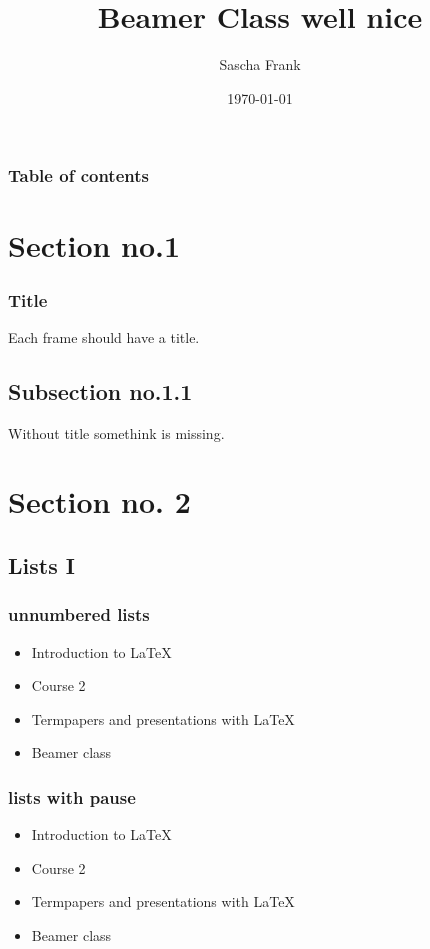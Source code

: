 \documentclass{beamer}
\begin{document}
\title{Beamer Class well nice}  
\author{Sascha Frank}
\date{\today} 

\begin{frame}
\titlepage
\end{frame}

\begin{frame}\frametitle{Table of contents}\tableofcontents
\end{frame} 


\section{Section no.1} 
\begin{frame}\frametitle{Title} 
Each frame should have a title.
\end{frame}
\subsection{Subsection no.1.1  }
\begin{frame} 
Without title somethink is missing. 
\end{frame}


\section{Section no. 2} 
\subsection{Lists I}
\begin{frame}\frametitle{unnumbered lists}
\begin{itemize}
\item Introduction to  \LaTeX  
\item Course 2 
\item Termpapers and presentations with \LaTeX 
\item Beamer class
\end{itemize} 
\end{frame}

\begin{frame}\frametitle{lists with pause}
\begin{itemize}
\item Introduction to  \LaTeX \pause 
\item Course 2 \pause 
\item Termpapers and presentations with \LaTeX \pause 
\item Beamer class
\end{itemize} 
\end{frame}
\end{document}
